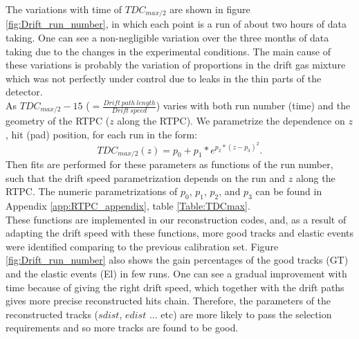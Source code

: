 The variations with time of $TDC_{max/2}$ are shown in figure 
\ref{fig:Drift_run_number}, in which each point is a run of about two hours of 
data taking. One can see a non-negligible variation over the three months of 
data taking due to the changes in the experimental conditions. The main cause 
of these variations is probably the variation of proportions in the drift gas 
mixture which was not perfectly under control due to leaks in the thin parts of 
the detector.\\

As $TDC_{max/2} -15 $ ($= \frac{Drift~path~length}{Drift~speed}$) varies with 
both run number (time) and the geometry of the RTPC ($z$ along the RTPC). We
parametrize the dependence on $z$, hit (pad) position, for each run in the 
form:\\
\begin{equation}
TDC_{max/2} (z)= p_{0} +  p_{1} * e^{p_{2}*(z-p_{3})^{2}}.
\label{equ:drift_speed_fit}
\end{equation}
Then fits are performed for these parameters as functions of the run number, 
such that the drift speed parametrization depends on the run and $z$ along the 
RTPC. The numeric parametrizations of $p_{0}$, $p_{1}$, $p_{2}$, and $p_{3}$ 
can be found in Appendix \ref{app:RTPC_appendix}, table \ref{Table:TDCmax}. \\

These functions are implemented in our reconstruction codes, and, as a result 
of adapting the drift speed with these functions, more good tracks and elastic 
events were identified comparing to the previous calibration set. Figure 
\ref{fig:Drift_run_number} also shows the gain percentages of the good tracks 
(GT) and the elastic events (El) in few runs. One can see a gradual improvement 
with time because of giving the right drift speed, which together with the 
drift paths gives more precise reconstructed hits chain. Therefore, the 
parameters of the reconstructed tracks ($sdist$, $edist$ ... etc) are more likely to pass the 
selection requirements and so more tracks are found to be good. \\


